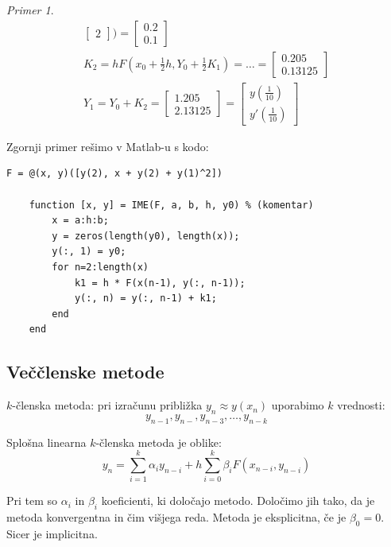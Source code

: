 \documentclass[a4paper,12pt]{article}
\theoremstyle{definition}
\theoremstyle{remark}
\newtheorem*{ex}{Primer}
\begin{document}
\begin{ex}
\begin{gather*}
\begin{bmatrix}
            2
        \end{bmatrix}) = \begin{bmatrix}
            0.2 \\
            0.1
        \end{bmatrix} \\
        K_2 = h F(x_0 + \frac{1}{2}h, Y_0 + \frac{1}{2} K_1) = \dots = \begin{bmatrix}
            0.205 \\
            0.13125
        \end{bmatrix} \\
        Y_1 = Y_0 + K_2 = \begin{bmatrix}
            1.205 \\
            2.13125
        \end{bmatrix} = \begin{bmatrix}
            y(\frac{1}{10}) \\
            y'(\frac{1}{10})
        \end{bmatrix}
    \end{gather*}
\end{ex}

Zgornji primer rešimo v Matlab-u s kodo:
\begin{lstlisting}[style=matlab, label=matlab-code]
    F = @(x, y)([y(2), x + y(2) + y(1)^2])
    
    function [x, y] = IME(F, a, b, h, y0) % (komentar)
        x = a:h:b;
        y = zeros(length(y0), length(x));
        y(:, 1) = y0;
        for n=2:length(x)
            k1 = h * F(x(n-1), y(:, n-1));
            y(:, n) = y(:, n-1) + k1;
        end
    end
    \end{lstlisting}
    

\subsection{Veččlenske metode}
$k$-členska metoda:
pri izračunu približka $y_n \approx y(x_n)$ uporabimo $k$ vrednosti:
\begin{equation*}
    y_{n-1}, y_{n-}, y_{n-3}, \dots, y_{n-k}
\end{equation*}

Splošna linearna $k$-členska metoda je oblike:
\begin{equation*}
    y_n = \sum_{i=1}^{k} \alpha_i y_{n-i} + h \sum_{i=0}^{k} \beta_i F(x_{n-i}, y_{n-i})
\end{equation*}

Pri tem so $\alpha_i$ in $\beta_i$ koeficienti, ki določajo metodo. Določimo jih tako, da je metoda konvergentna in čim višjega reda.
Metoda je eksplicitna, če je $\beta_0 = 0$. Sicer je implicitna.
\end{document}
